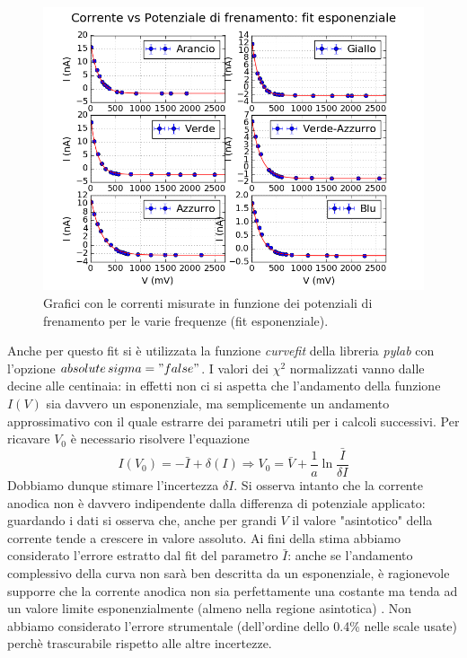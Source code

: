 \documentclass[10pt,a4paper]{article}
\begin{document}
\begin{figure}[!htb]
\centering
\includegraphics[scale=0.9]{fitesponenziale.png}
\caption{Grafici con le correnti misurate in funzione dei potenziali di frenamento per le varie frequenze (fit esponenziale).\label{fig:fitexp}}
\end{figure}

Anche per questo fit si è utilizzata la funzione \emph{curvefit} della libreria \emph{pylab} con l'opzione \emph{$absolute\,sigma = "false"$}.
I valori dei $\chi^2$ normalizzati vanno dalle decine alle centinaia: in effetti non ci si aspetta che l'andamento della funzione $I(V)$ sia davvero un esponenziale, ma semplicemente un andamento approssimativo con il quale estrarre dei parametri utili per i calcoli successivi.
Per ricavare $V_0$ è necessario risolvere l'equazione
\begin{equation}\label{eq:v0exp}
I(V_0)=-\bar{I}+\delta(I)\Rightarrow V_0=\bar{V}+\frac{1}{a}\ln\frac{\bar{I}}{\delta I}
\end{equation} 
Dobbiamo dunque stimare l'incertezza $\delta I$. 
Si osserva intanto che la corrente anodica non è davvero indipendente dalla differenza di potenziale applicato: guardando i dati si osserva che, anche per grandi $V$ il valore "asintotico" della corrente tende a crescere in valore assoluto.
Ai fini della stima abbiamo considerato l'errore estratto dal fit del parametro $\bar{I}$: anche se l'andamento complessivo della curva non sarà ben descritta da un esponenziale, è ragionevole supporre che la corrente anodica non sia perfettamente una costante ma tenda ad un valore limite esponenzialmente (almeno nella regione asintotica) .
Non abbiamo considerato l'errore strumentale (dell'ordine dello 0.4\% nelle scale usate) perchè trascurabile rispetto alle altre incertezze.
\end{document}
